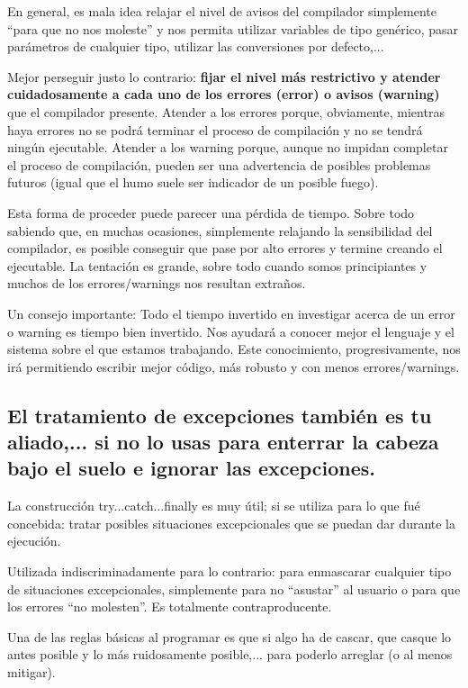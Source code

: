 \documentclass[spanish,12pt,a4paper,final,oneside]{book}
\begin{document}
En general, es mala idea relajar el nivel de avisos del compilador simplemente ``para que no nos moleste'' y nos permita utilizar variables de tipo genérico, pasar parámetros de cualquier tipo, utilizar las conversiones por defecto,... 

Mejor perseguir justo lo contrario: \textbf{fijar el nivel más restrictivo y atender cuidadosamente a cada uno de los errores (error) o avisos (warning)} que el compilador presente. Atender a los errores porque, obviamente, mientras haya errores no se podrá terminar el proceso de compilación y no se tendrá ningún ejecutable. Atender a los warning porque, aunque no impidan completar el proceso de compilación, pueden ser una advertencia de posibles problemas futuros (igual que el humo suele ser indicador de un posible fuego).

Esta forma de proceder puede parecer una pérdida de tiempo. Sobre todo sabiendo que, en muchas ocasiones, simplemente relajando la sensibilidad del compilador, es posible conseguir que pase por alto errores y termine creando el ejecutable. La tentación es grande, sobre todo cuando somos principiantes y muchos de los errores/warnings nos resultan extraños.

Un consejo importante: Todo el tiempo invertido en investigar acerca de un error o warning es tiempo bien invertido. Nos ayudará a conocer mejor el lenguaje y el sistema sobre el que estamos trabajando. Este conocimiento, progresivamente, nos irá permitiendo escribir mejor código, más robusto y con menos errores/warnings.

\subsection{El tratamiento de excepciones también es tu aliado,... si no lo usas para enterrar la cabeza bajo el suelo e ignorar las excepciones.}
La construcción try...catch...finally es muy útil; si se utiliza para lo que fué concebida: tratar posibles situaciones excepcionales que se puedan dar durante la ejecución. 

Utilizada indiscriminadamente para lo contrario: para enmascarar cualquier tipo de situaciones excepcionales, simplemente para no ``asustar'' al usuario o para que los errores ``no molesten''. Es totalmente contraproducente. 

Una de las reglas básicas al programar es que si algo ha de cascar, que casque lo antes posible y lo más ruidosamente posible,... para poderlo arreglar (o al menos mitigar). 
\end{document}
